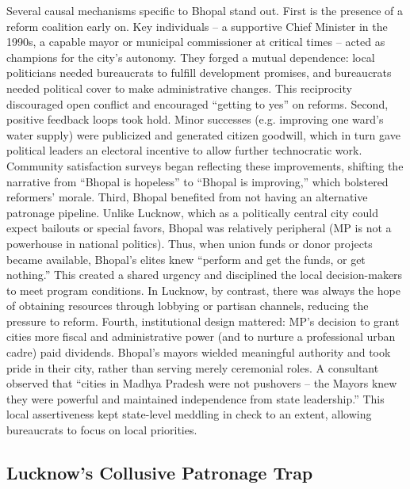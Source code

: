 Several causal mechanisms specific to Bhopal stand out. First is the presence of a reform coalition early on. Key individuals – a supportive Chief Minister in the 1990s, a capable mayor or municipal commissioner at critical times – acted as champions for the city's autonomy. They forged a mutual dependence: local politicians needed bureaucrats to fulfill development promises, and bureaucrats needed political cover to make administrative changes. This reciprocity discouraged open conflict and encouraged ``getting to yes'' on reforms. Second, positive feedback loops took hold. Minor successes (e.g. improving one ward's water supply) were publicized and generated citizen goodwill, which in turn gave political leaders an electoral incentive to allow further technocratic work. Community satisfaction surveys began reflecting these improvements, shifting the narrative from ``Bhopal is hopeless'' to ``Bhopal is improving,'' which bolstered reformers' morale. Third, Bhopal benefited from not having an alternative patronage pipeline. Unlike Lucknow, which as a politically central city could expect bailouts or special favors, Bhopal was relatively peripheral (MP is not a powerhouse in national politics). Thus, when union funds or donor projects became available, Bhopal's elites knew ``perform and get the funds, or get nothing.'' This created a shared urgency and disciplined the local decision-makers to meet program conditions. In Lucknow, by contrast, there was always the hope of obtaining resources through lobbying or partisan channels, reducing the pressure to reform. Fourth, institutional design mattered: MP's decision to grant cities more fiscal and administrative power (and to nurture a professional urban cadre) paid dividends. Bhopal's mayors wielded meaningful authority and took pride in their city, rather than serving merely ceremonial roles. A consultant observed that ``cities in Madhya Pradesh were not pushovers – the Mayors knew they were powerful and maintained independence from state leadership.'' This local assertiveness kept state-level meddling in check to an extent, allowing bureaucrats to focus on local priorities.

\subsection{Lucknow's Collusive Patronage Trap}

